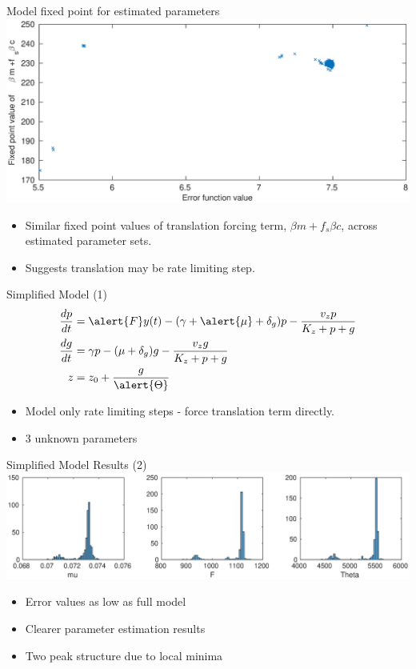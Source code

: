 \documentclass{beamer}
\begin{document}
\begin{frame}{Model fixed point for estimated parameters}
  \includegraphics[scale = 0.24, clip = true, trim = 0 0 0 0]{../Figures/fixedpoint_f}
\begin{itemize}
	\item Similar fixed point values of translation forcing term, ${\beta} m +{f_{s}}\beta c$, across estimated parameter sets.
	\item Suggests translation may be rate limiting step.
\end{itemize}
\end{frame}


\begin{frame}{Simplified Model (1)}
\begin{align*}
\frac{dp}{dt} & = \alert{F}y(t)-(\gamma + \alert{\mu} + \delta_{g})p - \frac{v_{z}p}{K_{z}+p+g}   \\
\frac{dg}{dt} & = \gamma p - (\mu + \delta_{g})g - \frac{v_{z}g}{K_{z}+p+g}  \\
z &= z_{0} +\frac{g}{\alert{\Theta}} 
\end{align*}
\begin{itemize}
\item  Model only rate limiting steps - force translation term directly.
\item 3 unknown parameters
\end{itemize}
\end{frame}


\begin{frame}{Simplified Model Results (2)}
  \includegraphics[scale = 0.28, clip = true, trim = 100 0 0 400]{../Figures/13_9_hist_simplified}
  \begin{itemize}
\item  Error values as low as full model
\item Clearer parameter estimation results
\item Two peak structure due to local minima
\end{itemize}
\end{frame}
\end{document}
